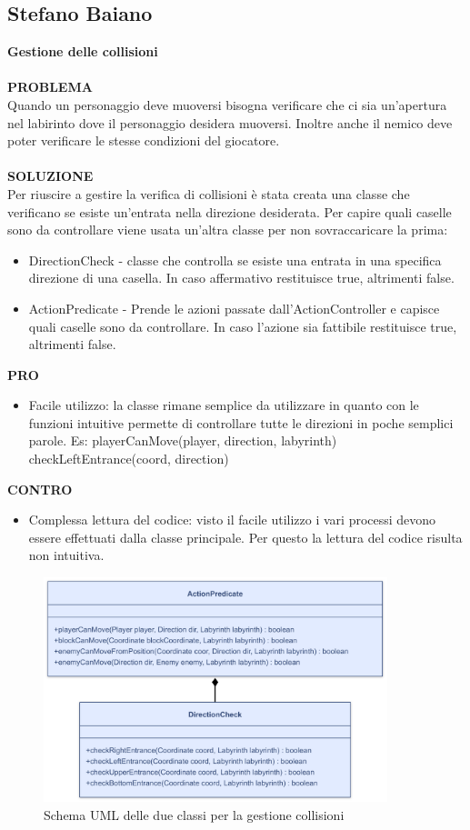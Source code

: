 \documentclass[a4paper,12pt]{report}
\begin{document}
\subsection{Stefano Baiano}
\textbf{Gestione delle collisioni}
\\
\\
\textbf{PROBLEMA}
\\
Quando un personaggio deve muoversi bisogna verificare che ci sia un'apertura nel labirinto dove il personaggio
desidera muoversi. Inoltre anche il nemico deve poter verificare le stesse condizioni del giocatore.
\\
\\
\textbf{SOLUZIONE}
\\
Per riuscire a gestire la verifica di collisioni è stata creata una classe che verificano se esiste un'entrata nella direzione desiderata. 
Per capire quali caselle sono da controllare viene usata un'altra classe per non sovraccaricare la prima:
\begin{itemize}
	\item DirectionCheck - classe che controlla se esiste una entrata in una specifica direzione di una casella. In caso affermativo restituisce true, altrimenti false.
	\item ActionPredicate - Prende le azioni passate dall'ActionController e capisce quali caselle sono da controllare. In caso l'azione sia fattibile restituisce true, altrimenti false.
\end{itemize}
\textbf{PRO}
\\
\begin{itemize}
	\item Facile utilizzo: la classe rimane semplice da utilizzare in quanto con le funzioni intuitive permette di controllare tutte le direzioni
	in poche semplici parole. Es: playerCanMove(player, direction, labyrinth) checkLeftEntrance(coord, direction)
\end{itemize}
\textbf{CONTRO}
\\
\begin{itemize}
	\item Complessa lettura del codice: visto il facile utilizzo i vari processi devono essere effettuati dalla classe principale. 
	Per questo la lettura del codice risulta non intuitiva.
\end{itemize}
\begin{figure}[H]
	\centering{}
	\includegraphics[width=10cm]{img/GestioneCollisioni.png}
	\caption{Schema UML delle due classi per la gestione collisioni}
	\label{img:GestioneCollisioni}
\end{figure}
\end{document}

